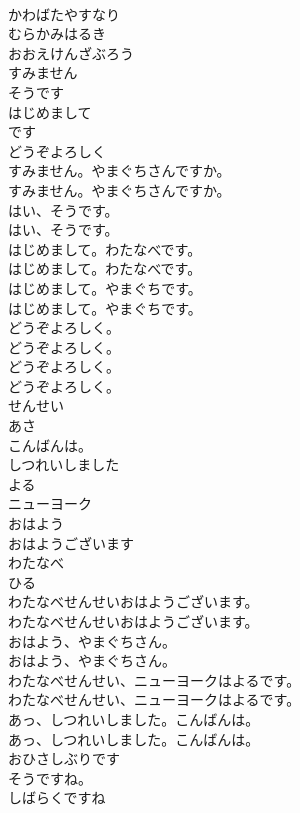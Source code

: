 \documentclass[8pt]{extreport}
\begin{document}
\begin{CJK}{UTF8}{min}
\\	かわばたやすなり
\\	むらかみはるき
\\	おおえけんざぶろう
\\	すみません
\\	そうです
\\	はじめまして
\\	です
\\	どうぞよろしく
\\	すみません。やまぐちさんですか。	
\\	すみません。やまぐちさんですか。 
\\	はい、そうです。	
\\	はい、そうです。 
\\	はじめまして。わたなべです。	
\\	はじめまして。わたなべです。 
\\	はじめまして。やまぐちです。	
\\	はじめまして。やまぐちです。 
\\	どうぞよろしく。	
\\	どうぞよろしく。 
\\	どうぞよろしく。	
\\	どうぞよろしく。 
\\	せんせい
\\	あさ
\\	こんばんは。
\\	しつれいしました
\\	よる
\\	ニューヨーク
\\	おはよう
\\	おはようございます
\\	わたなべ
\\	ひる
\\	わたなべせんせいおはようございます。	
\\	わたなべせんせいおはようございます。 
\\	おはよう、やまぐちさん。	
\\	おはよう、やまぐちさん。 
\\	わたなべせんせい、ニューヨークはよるです。	
\\	わたなべせんせい、ニューヨークはよるです。 
\\	あっ、しつれいしました。こんばんは。	
\\	あっ、しつれいしました。こんばんは。 
\\	おひさしぶりです
\\	そうですね。
\\	しばらくですね

\end{CJK}
\end{document}
